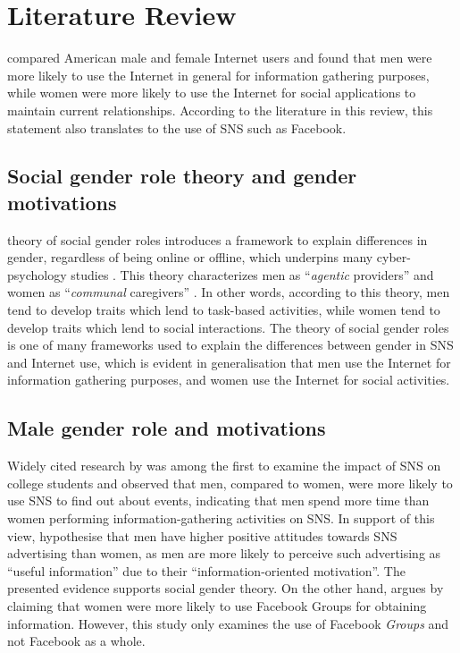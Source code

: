 \section{Literature Review}

\citet{Fallows2005} compared American male and female Internet users and found that men were more likely to use the Internet in general for information gathering purposes, while women were more likely to use the Internet for social applications to maintain current relationships. According to the literature in this review, this statement also translates to the use of SNS such as Facebook.

\subsection{Social gender role theory and gender motivations}

 theory of social gender roles introduces a framework to explain differences in gender, regardless of being online or offline, which underpins many cyber-psychology studies \citep{Hum2011, Tifferet2014, Kimbrough2013}. This theory characterizes men as ``\emph{agentic} providers'' and women as ``\emph{communal} caregivers'' \citep[p. 1830]{Hum2011}. In other words, according to this theory, men tend to develop traits which lend to task-based activities, while women tend to develop traits which lend to social interactions. The theory of social gender roles is one of many frameworks used to explain the differences between gender in SNS and Internet use, which is evident in  generalisation that men use the Internet for information gathering purposes, and women use the Internet for social activities.

\subsection{Male gender role and motivations}

Widely cited research by \citet{Raacke2008} was among the first to examine the impact of SNS on college students and observed that men, compared to women, were more likely to use SNS to find out about events, indicating that men spend more time than women performing information-gathering activities on SNS. In support of this view, \citet[p. 2]{Choi2014} hypothesise that men have higher positive attitudes towards SNS advertising than women, as men are more likely to perceive such advertising as ``useful information'' due to their ``information-oriented motivation''. The presented evidence supports  social gender theory. On the other hand, \citet{Park2009} argues by claiming that women were more likely to use Facebook Groups for obtaining information. However, this study only examines the use of Facebook \emph{Groups} and not Facebook as a whole. 

